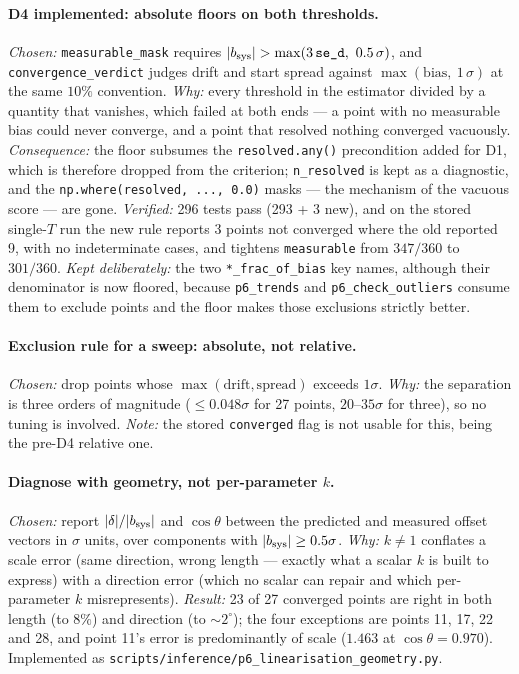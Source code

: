 \documentclass[11pt]{article}
\begin{document}
\paragraph{D4 implemented: absolute floors on both thresholds.}
\emph{Chosen:} \texttt{measurable\_mask} requires
$|b_{\rm sys}| > \max(3\,\texttt{se\_d},\ 0.5\,\sigma)$, and
\texttt{convergence\_verdict} judges drift and start spread against
$\max(\text{bias},\ 1\,\sigma)$ at the same $10\%$ convention. \emph{Why:}
every threshold in the estimator divided by a quantity that vanishes, which
failed at both ends --- a point with no measurable bias could never converge,
and a point that resolved nothing converged vacuously. \emph{Consequence:} the
floor subsumes the \texttt{resolved.any()} precondition added for D1, which is
therefore dropped from the criterion; \texttt{n\_resolved} is kept as a
diagnostic, and the \texttt{np.where(resolved, ..., 0.0)} masks --- the
mechanism of the vacuous score --- are gone. \emph{Verified:} 296 tests pass
(293 + 3 new), and on the stored single-$T$ run the new rule reports 3 points
not converged where the old reported 9, with no indeterminate cases, and
tightens \texttt{measurable} from $347/360$ to $301/360$. \emph{Kept
deliberately:} the two \texttt{*\_frac\_of\_bias} key names, although their
denominator is now floored, because \texttt{p6\_trends} and
\texttt{p6\_check\_outliers} consume them to exclude points and the floor makes
those exclusions strictly better.

\paragraph{Exclusion rule for a sweep: absolute, not relative.}
\emph{Chosen:} drop points whose $\max(\text{drift},\text{spread})$ exceeds
$1\sigma$. \emph{Why:} the separation is three orders of magnitude
($\le0.048\sigma$ for 27 points, $20$--$35\sigma$ for three), so no tuning is
involved. \emph{Note:} the stored \texttt{converged} flag is not usable for
this, being the pre-D4 relative one.

\paragraph{Diagnose with geometry, not per-parameter $k$.} \emph{Chosen:}
report $|\delta|/|b_{\rm sys}|$ and $\cos\theta$ between the predicted and
measured offset vectors in $\sigma$ units, over components with
$|b_{\rm sys}|\ge0.5\sigma$. \emph{Why:} $k\neq1$ conflates a scale error (same
direction, wrong length --- exactly what a scalar $k$ is built to express) with
a direction error (which no scalar can repair and which per-parameter $k$
misrepresents). \emph{Result:} 23 of 27 converged points are right in both
length (to $8\%$) and direction (to ${\sim}2^\circ$); the four exceptions are
points 11, 17, 22 and 28, and point 11's error is predominantly of scale
($1.463$ at $\cos\theta=0.970$). Implemented as
\texttt{scripts/inference/p6\_linearisation\_geometry.py}.
\end{document}
